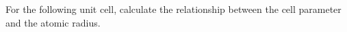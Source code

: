 \documentclass[main.tex]{subfiles}
\begin{document}
\begin{description}
\begin{example} %
For the following unit cell, calculate the relationship between the cell parameter and the atomic radius. 
\begin{center}
\scalebox{0.2}{
\begin{tikzpicture}
%
%
%
%

\end{tikzpicture}}
\end{center}
\end{example}
\end{description}
\end{document}

